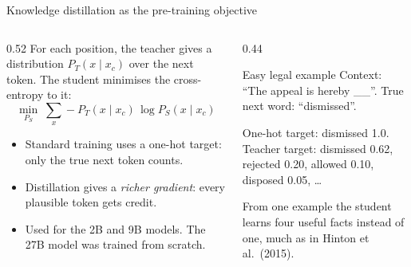 \documentclass[aspectratio=169,11pt]{beamer}
\begin{document}
\begin{frame}{Knowledge distillation as the pre-training objective}
  \begin{columns}[T]
    \begin{column}{0.52\textwidth}
      \small
      For each position, the teacher gives a distribution $P_T(x\mid x_c)$ over the next token. The student minimises the cross-entropy to it:
      \[
        \min_{P_S}\;\sum_x -P_T(x\mid x_c)\,\log P_S(x\mid x_c)
      \]
      \begin{itemize}
        \item Standard training uses a one-hot target: only the true next token counts.
        \item Distillation gives a \emph{richer gradient}: every plausible token gets credit.
        \item Used for the 2B and 9B models. The 27B model was trained from scratch.
      \end{itemize}
    \end{column}
    \begin{column}{0.44\textwidth}
      \begin{exampleblock}{Easy legal example}
        \small
        Context: ``The appeal is hereby \_\_''. True next word: ``dismissed''.
        \vspace{1mm}

        One-hot target: dismissed 1.0.\\
        Teacher target: dismissed 0.62, rejected 0.20, allowed 0.10, disposed 0.05, \ldots
        \vspace{1mm}

        From one example the student learns four useful facts instead of one, much as in Hinton et al.\ (2015).
      \end{exampleblock}
    \end{column}
  \end{columns}
\end{frame}
\end{document}
